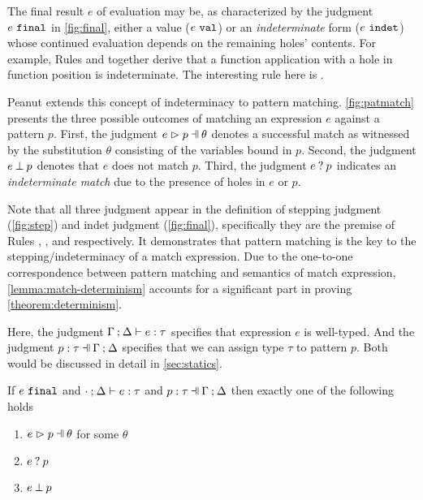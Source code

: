 The final result $e$ of evaluation may be, as characterized by the judgment $e ~\mathtt{final}$ in \autoref{fig:final}, either a value ($e ~\mathtt{val}$) or an \emph{indeterminate} form ($e ~\mathtt{indet}$) whose continued evaluation depends on the remaining holes' contents. For example, Rules \IAp and \IEHole together derive that a function application with a hole in function position is indeterminate. The interesting rule here is \IMatch.



Peanut extends this concept of indeterminacy to pattern matching.
\autoref{fig:patmatch} presents the three possible outcomes of matching an expression $e$ against a pattern $p$. 
First, the judgment $\hpatmatch{e}{p}{\theta}$ denotes a successful match as witnessed by the substitution $\theta$ consisting of the variables bound in $p$. Second, the judgment $e \mathbin{\bot} p$ denotes that $e$ does not match $p$. Third, the judgment $e \mathbin{?} p$ indicates an \emph{indeterminate match} due to the presence of holes in $e$ or $p$. 

Note that all three judgment appear in the definition of stepping judgment (\autoref{fig:step}) and indet judgment (\autoref{fig:final}), specifically they are the premise of Rules \ITSuccMatch, \ITFailMatch, and \IMatch respectively. It demonstrates that pattern matching is the key to the stepping/indeterminacy of a match expression.
Due to the one-to-one correspondence between pattern matching and semantics of match expression, \autoref{lemma:match-determinism} accounts for a significant part in proving \autoref{theorem:determinism}.

Here, the judgment $\Gamma \mathbin{;} \Delta \vdash e : \tau$ specifies that expression $e$ is well-typed. And the judgment $\hpattyp{p}{\tau}{\Gamma}{\Delta}$ specifies that we can assign type $\tau$ to pattern $p$. Both would be discussed in detail in \autoref{sec:statics}.
\begin{lemma}
  \label{lemma:match-determinism}
  If $e ~\mathtt{final}$ and $\cdot \mathbin{;} \Delta \vdash e : \tau$ and $\hpattyp{p}{\tau}{\Gamma}{\Delta}$ then exactly one of the following holds
  \begin{enumerate}
    \item $\hpatmatch{e}{p}{\theta}$ for some $\theta$
    \item $e \mathbin{?} p$
    \item $e \mathbin{\bot} p$
  \end{enumerate}
\end{lemma}

